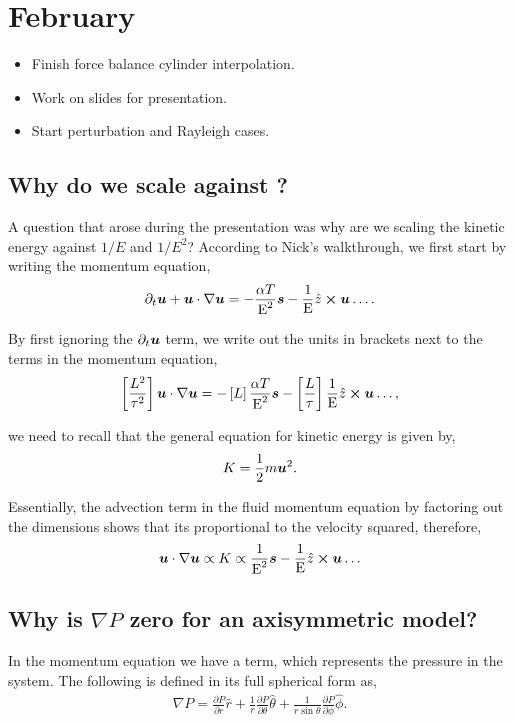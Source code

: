 \section{February}

\begin{itemize}
	\item Finish force balance cylinder interpolation.
	\item Work on slides for presentation.
	\item Start perturbation and Rayleigh cases. 

\end{itemize}


\subsection{Why do we scale against \ekman?}
\kevek
A question that arose during the presentation was why are we scaling the kinetic energy against $1/E$ and $1/E^2$? According to Nick's walkthrough, we first start by writing the momentum equation, 
\begin{align}
	\partial_t \boldsymbol{u} + \boldsymbol{u} \cdot \nabla \boldsymbol{u} = - \frac{\alpha T}{\text{E}^2} \boldsymbol{s} - \frac{1}{\text{E}} \hat{z} \cross \boldsymbol{u} \dots. 
\end{align}

By first ignoring the $\partial_t \boldsymbol{u}$ term, we write out the units in brackets next to the terms in the momentum equation, 
\begin{align}
	\left[\frac{L^2}{\tau^2} \right] \boldsymbol{u} \cdot \nabla \boldsymbol{u} = - \left[L \right] \frac{\alpha T}{\text{E}^2} \boldsymbol{s} - \left[\frac{L}{\tau} \right] \frac{1}{\text{E}} \hat{z} \cross \boldsymbol{u} \dots,  
\end{align}

we need to recall that the general equation for kinetic energy is given by, 
\begin{align}
	K = \frac{1}{2} m \boldsymbol{u}^2. 
\end{align}

Essentially, the advection term in the fluid momentum equation by factoring out the dimensions shows that its proportional to the velocity squared, therefore, 
\begin{align}
	\boldsymbol{u} \cdot \nabla \boldsymbol{u} \propto K \propto \frac{1}{\text{E}^2} \boldsymbol{s} - \frac{1}{\text{E}} \hat{z} \cross \boldsymbol{u} \dots
\end{align}

\subsection{Why is $\nabla P$ zero for an axisymmetric model?}
In the momentum equation we have a term, which represents the pressure in the system. The following is defined in its full spherical form as, 
\begin{align}
	\nabla P = \frac{\partial P}{\partial r} \hat{r} + \frac{1}{r} \frac{\partial P}{\partial \theta} \hat{\theta} + \frac{1}{r \sin{\theta}} \frac{\partial P}{\partial \phi} \hat{\phi}.
\end{align}

